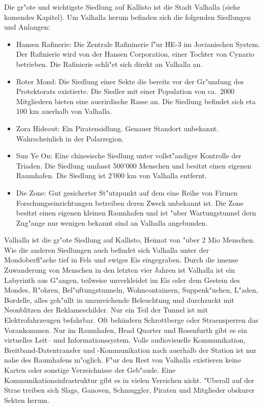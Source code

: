 Die gr"o\3te und wichtigste Siedlung auf Kallisto ist die Stadt Valhalla (siehe komendes Kapitel). Um Valhalla herum befinden
sich die folgenden Siedlungen und Anlangen:

\begin{itemize}
    \item Hansen Rafinerie: Die Zentrale Rafininerie f"ur HE-3 im Jovianischen System. Der Rafinierie wird von der Hansen 
    Corporation, einer Tochter von Cynario betrieben. Die Rafinierie schli"e\3t sich direkt an Valhalla an.
    \item Roter Mond: Die Siedlung einer Sekte die bereits vor der Gr"undung des Protektorats existierte. Die Siedler mit einer Population von ca.~2000 Mitgliedern bieten eine au\3erirdische Rasse an. Die Siedlung befindet sich eta 100 km au\3erhalb von Valhalla.
    \item Zora Hideout: Ein Piratensidlung. Genauer Standort unbekannt. Wahrscheinlich in der Polarregion.
    \item Sun Ye On: Eine chinesische Siedlung unter vollst"andiger Kontrolle der Triaden. Die Siedlung umfasst 500'000 Menschen und besitzt einen eigenen Raumhafen. Die Siedlung ist 2'000 km von Valhalla entfernt.
    \item Die Zone: Gut gesicherter St"utzpunkt auf dem eine Reihe von Firmen Forschungseinrichtungen betreiben deren Zweck unbekannt ist. Die Zone besitzt einen eigenen kleinen Raumhafen und ist "uber Wartungstunnel dern Zug"ange nur wenigen bekannt sind an Valhalla angebunden.
\end{itemize}


Valhalla ist die gr"o\3te Siedlung auf Kallisto, Heimat von "uber 2 Mio Menschen. Wie die anderen Siedlungen auch befindet sich Valhalla unter der Mondoberfl"ache tief in Fels und ewiges Eis eingegraben. Durch die imense Zuwanderung von Menschen in den letzten vier Jahren ist Valhalla ist ein Labyrinth aus G"angen, teilweise unverkleidet im Eis oder dem Gestein des Mondes, R"ohren, Bel"uftungstunneln, Wohncontainern, Suppenk"uchen, L"aden, Bordelle, alles geh"ullt in unzureichende Beleuchtung und durchzuckt mit Neonblitzen der Reklameschilder. Nur ein Teil der Tunnel ist mit Elektrofahrzeugen befahrbar. Oft behindern Schrottberge oder Stra\3ensperren das Vorankommen. Nur im Raumhafen, Head Quarter und Rosenfurth gibt es ein virtuelles Leit-- und Informationssystem. Volle audiovisuelle Kommunikation, Breitband-Datentransfer und -Kommunikation nach au\3erhalb der Station ist nur nahe des Raumhafens m"oglich. F"ur den Rest von Valhalla existieren keine Karten oder sonstige Verzeichnisse der Geb"aude. Eine Kommunikationsinfrastruktur gibt es in vielen Vereichen nicht. "Uberall auf der Stra\3e treiben sich Slags, Ganoven, Schmuggler, Piraten  und Mitglieder obskurer Sekten herum.

